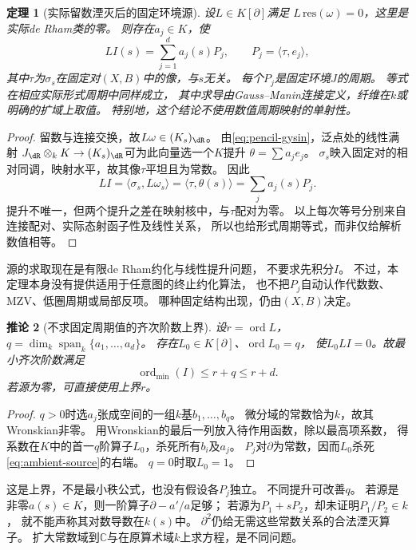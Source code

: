 \documentclass[11pt,a4paper]{ctexart}
\theoremstyle{cnplain}\newtheorem{theorem}{定理}[section]
\newtheorem{corollary}[theorem]{推论}
\theoremstyle{definition}\newtheorem{definition}[theorem]{定义}
\theoremstyle{remark}\newtheorem{remark}[theorem]{注}
\begin{document}
\begin{theorem}[实际留数湮灭后的固定环境源]\label{thm:ambient-source}
设$L\in K[\partial]$满足
$L\,\mathrm{res}(\omega)=0$，这里是实际de Rham类的零。
则存在$a_j\in K$，使
\begin{equation}\label{eq:ambient-source}
 L I(s)=\sum_{j=1}^d a_j(s)P_j,\qquad
 P_j=\langle\tau,e_j\rangle,
\end{equation}
其中$\tau$为$\sigma_s$在固定对$(X,B)$中的像，与$s$无关。
每个$P_j$是固定环境$J$的周期。
等式在相应实际形式周期中同样成立，
其中求导由Gauss--Manin连接定义，纤维在$k$或明确的扩域上取值。
特别地，这个结论不使用数值周期映射的单射性。
\end{theorem}
\begin{proof}
留数与连接交换，故$L\omega\in(K_s)_{\dR}$。
由\eqref{eq:pencil-gysin}，泛点处的线性满射
$J_{\dR}\otimes_k K\to(K_s)_{\dR}$可为此向量选一个$K$提升
$\theta=\sum a_je_j$。
$\sigma_s$映入固定对的相对同调，映射水平，故其像$\tau$平坦且为常数。
因此
\[
 LI=\langle\sigma_s,L\omega_s\rangle
   =\langle\tau,\theta(s)\rangle=\sum_j a_j(s)P_j.
\]
提升不唯一，但两个提升之差在映射核中，与$\tau$配对为零。
以上每次等号分别来自连接配对、实际态射函子性及线性关系，
所以也给形式周期等式，而非仅给解析数值相等。
\end{proof}

源的求取现在是有限de Rham约化与线性提升问题，
不要求先积分$I$。
不过，本定理本身没有提供适用于任意图的终止约化算法，
也不把$P_j$自动认作代数数、MZV、低圈周期或局部反项。
哪种固定结构出现，仍由$(X,B)$决定。

\begin{corollary}[不求固定周期值的齐次阶数上界]\label{cor:ambient-order}
设$r=\operatorname{ord}L$，
$q=\dim_k\operatorname{span}_k\{a_1,\ldots,a_d\}$。
存在$L_0\in K[\partial]$、$\operatorname{ord}L_0=q$，
使$L_0LI=0$。故最小齐次阶数满足
\[
 \operatorname{ord}_{\min}(I)\le r+q\le r+d.
\]
若源为零，可直接使用上界$r$。
\end{corollary}
\begin{proof}
$q>0$时选$a_j$张成空间的一组$k$基$b_1,\ldots,b_q$。
微分域的常数恰为$k$，故其Wronskian非零。
用Wronskian的最后一列放入待作用函数，除以最高项系数，
得系数在$K$中的首一$q$阶算子$L_0$，杀死所有$b_i$及$a_j$。
$P_j$对$\partial$为常数，因而$L_0$杀死\eqref{eq:ambient-source}的右端。
$q=0$时取$L_0=1$。
\end{proof}

这是上界，不是最小秩公式，也没有假设各$P_j$独立。
不同提升可改善$q$。
若源是非零$a(s)\in K$，则一阶算子$\partial-a'/a$足够；
若源为$P_1+sP_2$，却未证明$P_1/P_2\in k$，
就不能声称其对数导数在$k(s)$中。
$\partial^2$仍给无需这些常数关系的合法湮灭算子。
扩大常数域到$\mathbb C$与在原算术域$k$上求方程，是不同问题。
\end{document}
